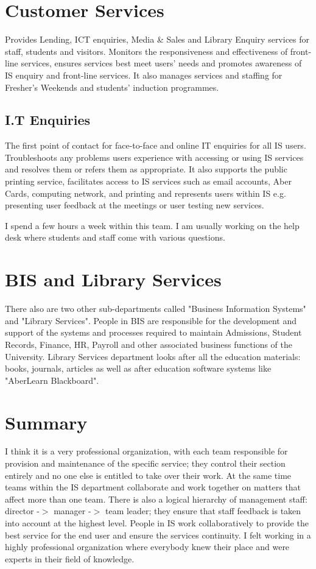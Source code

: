 \documentclass[10pt,a4paper,headinclude=true,twoside]{report}
\begin{document}
\section{Customer Services}
Provides Lending, ICT enquiries, Media \& Sales and Library Enquiry services for staff, students and visitors. Monitors the responsiveness and effectiveness of front-line services, ensures services best meet users' needs and promotes awareness of IS enquiry and front-line services. It also manages services and staffing for Fresher's Weekends and students' induction programmes.\cite{InternalTeamdescription}
\subsection{I.T Enquiries}
The first point of contact for face-to-face and online IT enquiries for all IS users. Troubleshoots any problems users experience with accessing or using IS services and resolves them or refers them as appropriate. It also supports the public printing service, facilitates access to IS services such as email accounts, Aber Cards, computing network, and printing and represents users within IS e.g. presenting user feedback at the meetings or user testing new services. \cite{InternalTeamdescription}

I spend a few hours a week within this team. I am usually working on the help desk where students and staff come with various questions.

\section{BIS and Library Services}
There also are two other sub-departments called "Business Information Systems" and "Library Services". People in BIS are  responsible for the development and support of the systems and processes required to maintain Admissions, Student Records, Finance, HR, Payroll and other associated business functions of the University. Library Services department looks after all the education materials: books, journals, articles as well as after education software systems like "AberLearn Blackboard".\cite{InternalTeamdescription}

\section{Summary}
I think it is a very professional organization, with each team responsible for provision and maintenance of the specific service; they control their section entirely and no one else is entitled to take over their work. At the same time teams within the IS department collaborate and work together on matters that affect more than one team. There is also a logical hierarchy of management staff: director -$>$ manager -$>$ team leader; they ensure that staff feedback is taken into account at the highest level. People in IS work collaboratively to provide the best service for the end user and ensure the services continuity. I felt working in a highly professional organization where everybody knew their place and were experts in their field of knowledge.
\end{document}
